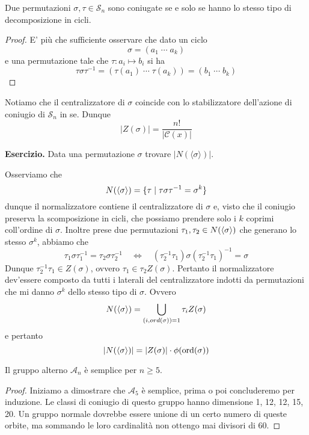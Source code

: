 \begin{multicols}{2}
\begin{prop}
	Due permutazioni $ \sigma, \tau \in \mathcal{S}_n $ sono coniugate se e solo se hanno lo stesso tipo di decomposizione in cicli.
\end{prop}
\begin{proof}
	E' più che sufficiente osservare che dato un ciclo $$  \sigma = (a_1 \; \cdots \; a_k)  $$ e una permutazione tale che $ \tau : a_i \mapsto b_i $ si ha
	\[\tau\sigma\tau^{-1} = (\tau(a_1) \; \cdots \; \tau(a_k)) = (b_1 \; \cdots \; b_k) \]
\end{proof}

\begin{remark}
	Notiamo che il centralizzatore di $ \sigma $ coincide con lo stabilizzatore dell'azione di coniugio di $ \mathcal{S}_n $ in se. Dunque
	\[ |Z(\sigma)| = \frac{n!}{|\mathcal{C}(x)|} \]
\end{remark}
\textbf{Esercizio.} Data una permutazione $ \sigma $ trovare $ |N(\langle \sigma \rangle)| $.

Osserviamo che
\[ N(\langle \sigma \rangle) = \{ \tau \mid \tau\sigma\tau^{-1} = \sigma^k \} \]
dunque il normalizzatore contiene il centralizzatore di $ \sigma $ e, visto che il coniugio preserva la scomposizione in cicli, che possiamo prendere solo i $ k $ coprimi coll'ordine di $ \sigma $. Inoltre prese due permutazioni $ \tau_1, \tau_2 \in N(\langle \sigma \rangle)$ che generano lo stesso $ \sigma^k $, abbiamo che
\[ \tau_1 \sigma \tau_1 ^{-1} = \tau_2 \sigma \tau_2 ^{-1} \quad\Leftrightarrow\quad (\tau_2^{-1}\tau_1) \sigma (\tau_2^{-1}\tau_1) ^{-1} = \sigma \]
Dunque $ \tau_2^{-1}\tau_1 \in Z(\sigma) $, ovvero $ \tau_1 \in \tau_2 Z(\sigma) $. Pertanto il normalizzatore dev'essere composto da tutti i laterali del centralizzatore indotti da permutazioni che mi danno $ \sigma^k $ dello stesso tipo di $ \sigma $.
Ovvero
\[ N(\langle \sigma \rangle) = \bigcup_{(i, ord(\sigma))= 1} \tau_i Z(\sigma) \]
e pertanto
\[ |N(\langle \sigma \rangle)| = |Z(\sigma)| \cdot \phi(\text{ord}(\sigma)) \]

\begin{theorem}
	Il gruppo alterno $ \mathcal{A}_n $ è semplice per $ n \geq 5 $.
\end{theorem}
\begin{proof}
	Iniziamo a dimostrare che $ \mathcal{A}_5 $ è semplice, prima o poi concluderemo per induzione. Le classi di coniugio di questo gruppo hanno dimensione 1, 12, 12, 15, 20. Un gruppo normale dovrebbe essere unione di un certo numero di queste orbite, ma sommando le loro cardinalità non ottengo mai divisori di 60.
\end{proof}


\end{multicols}
